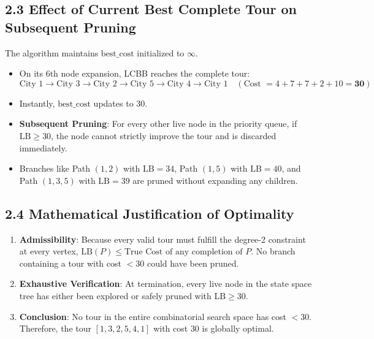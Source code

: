 \documentclass[12pt]{article}
\begin{document}
\subsection*{2.3 Effect of Current Best Complete Tour on Subsequent Pruning}
The algorithm maintains $\text{best\_cost}$ initialized to $\infty$.
\begin{itemize}
    \item On its 6th node expansion, LCBB reaches the complete tour:
    \[
    \text{City } 1 \to \text{City } 3 \to \text{City } 2 \to \text{City } 5 \to \text{City } 4 \to \text{City } 1 \quad (\text{Cost } = 4 + 7 + 7 + 2 + 10 = \mathbf{30})
    \]
    \item Instantly, $\text{best\_cost}$ updates to $30$.
    \item \textbf{Subsequent Pruning}: For every other live node in the priority queue, if $\text{LB} \ge 30$, the node cannot strictly improve the tour and is discarded immediately.
    \item Branches like Path $(1, 2)$ with $\text{LB}=34$, Path $(1, 5)$ with $\text{LB}=40$, and Path $(1, 3, 5)$ with $\text{LB}=39$ are pruned without expanding any children.
\end{itemize}

\subsection*{2.4 Mathematical Justification of Optimality}
\begin{enumerate}
    \item \textbf{Admissibility}: Because every valid tour must fulfill the degree-2 constraint at every vertex, $\text{LB}(P) \le \text{True Cost of any completion of } P$. No branch containing a tour with cost $< 30$ could have been pruned.
    \item \textbf{Exhaustive Verification}: At termination, every live node in the state space tree has either been explored or safely pruned with $\text{LB} \ge 30$.
    \item \textbf{Conclusion}: No tour in the entire combinatorial search space has cost $< 30$. Therefore, the tour $[1, 3, 2, 5, 4, 1]$ with cost $30$ is globally optimal.
\end{enumerate}
\end{document}
